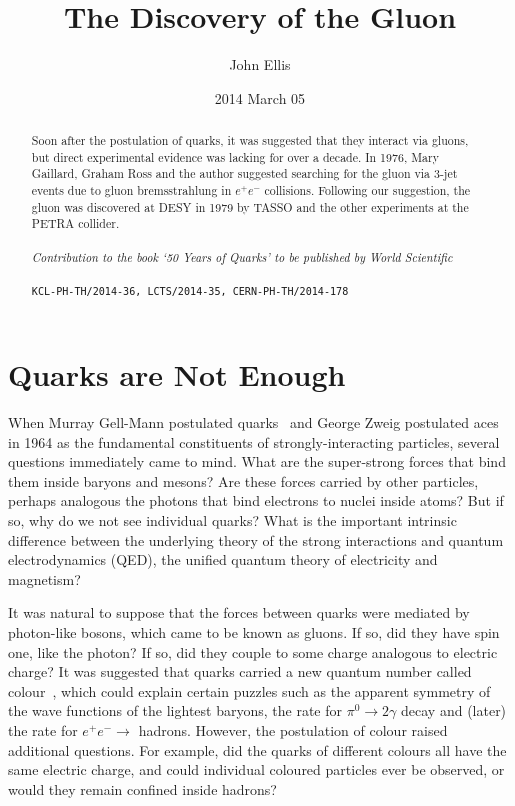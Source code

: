\documentclass[12pt]{article} %
\begin{document}
\title{The Discovery of the Gluon}
\date{2014 March 05}

\author{John Ellis}%

\maketitle

\begin{abstract}
Soon after the postulation of quarks, it was suggested that they interact via
gluons, but direct experimental evidence was lacking for over a decade.
In 1976, Mary Gaillard, Graham Ross and the author suggested searching for the
gluon via 3-jet events due to gluon bremsstrahlung in $e^+ e^-$ collisions. Following
our suggestion, the gluon was discovered at DESY in 1979 by TASSO and the other experiments
at the PETRA collider. \\ \\
\emph{Contribution to the book `50 Years of Quarks' to be published by World Scientific}\\ \\
{\tt KCL-PH-TH/2014-36, LCTS/2014-35, CERN-PH-TH/2014-178}


\end{abstract}



\section{Quarks are Not Enough}\label{ra_sec1}

When Murray Gell-Mann postulated quarks~\cite{MGM} and George Zweig postulated aces~\cite{GZ} in 1964 as the fundamental
constituents of strongly-interacting particles, several questions immediately came to mind.
What are the super-strong forces that bind them inside baryons and mesons?
Are these forces carried by other particles, perhaps analogous the photons that
bind electrons to nuclei inside atoms? But if so, why do we not see individual quarks?
What is the important intrinsic difference between the underlying theory
of the strong interactions and quantum electrodynamics (QED), the unified quantum theory of
electricity and magnetism?

It was natural to suppose that the forces between quarks were mediated by photon-like
bosons, which came to be known as gluons. If so, did they have spin one, like the photon?
If so, did they couple to some charge analogous to electric charge? It was suggested that
quarks carried a new quantum number called colour~\cite{colour}, which could explain certain puzzles
such as the apparent symmetry of the wave functions of the lightest baryons, the rate for
$\pi^0 \to 2 \gamma$ decay and (later) the rate for $e^+ e^- \to$ hadrons. However,
the postulation of colour raised additional questions. For example, did the quarks of
different colours all have the same electric charge, and could individual coloured
particles ever be observed, or would they remain confined inside hadrons?
\end{document}
